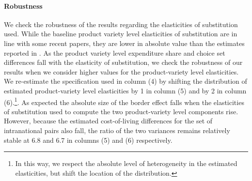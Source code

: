 \paragraph{Robustness}  We check the robustness of the results regarding the elasticities of substitution used. While the baseline product variety level elasticities of substitution are in line with some recent papers, they are lower in absolute value than the estimates reported in \citet{Hottman2016}. As the product variety level expenditure share and choice set differences fall with the elasticity of substitution, we check the robustness of our results when we consider higher values for the product-variety level elasticities. We re-estimate the specification used in column (4) by shifting the distribution of estimated product-variety level elasticities by 1 in column (5) and by 2 in column (6).\footnote{In this way, we respect the absolute level of heterogeneity in the estimated elasticities, but shift the location of the distribution.}. As expected the absolute size of the border effect falls when the elasticities of substitution used to compute the two product-variety level components rise. However, because the estimated cost-of-living differences for the set of intranational pairs also fall, the ratio of the two variances remains relatively stable at 6.8 and 6.7 in columns (5) and (6) respectively.

